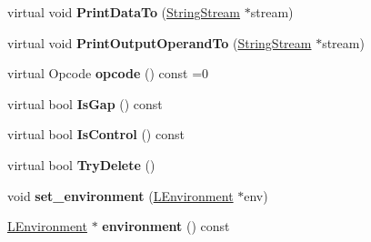 \begin{DoxyCompactItemize}
\item 
virtual void {\bfseries Print\+Data\+To} (\hyperlink{classv8_1_1internal_1_1_string_stream}{String\+Stream} $\ast$stream)\hypertarget{classv8_1_1internal_1_1_l_instruction_a3e3375f04ff4ab46cd75200cfa1b918d}{}\label{classv8_1_1internal_1_1_l_instruction_a3e3375f04ff4ab46cd75200cfa1b918d}

\item 
virtual void {\bfseries Print\+Output\+Operand\+To} (\hyperlink{classv8_1_1internal_1_1_string_stream}{String\+Stream} $\ast$stream)\hypertarget{classv8_1_1internal_1_1_l_instruction_af5f97137ae7c1b7af3737b41c235f28f}{}\label{classv8_1_1internal_1_1_l_instruction_af5f97137ae7c1b7af3737b41c235f28f}

\item 
virtual Opcode {\bfseries opcode} () const  =0\hypertarget{classv8_1_1internal_1_1_l_instruction_aa0129e8a782b2dd3d9753986e3d245f1}{}\label{classv8_1_1internal_1_1_l_instruction_aa0129e8a782b2dd3d9753986e3d245f1}

\item 
virtual bool {\bfseries Is\+Gap} () const \hypertarget{classv8_1_1internal_1_1_l_instruction_a96115165585397545ac4945072c27dfc}{}\label{classv8_1_1internal_1_1_l_instruction_a96115165585397545ac4945072c27dfc}

\item 
virtual bool {\bfseries Is\+Control} () const \hypertarget{classv8_1_1internal_1_1_l_instruction_a2cc159f22c6519accebaa83d4e554dd7}{}\label{classv8_1_1internal_1_1_l_instruction_a2cc159f22c6519accebaa83d4e554dd7}

\item 
virtual bool {\bfseries Try\+Delete} ()\hypertarget{classv8_1_1internal_1_1_l_instruction_ae33f8094c99e0ec89bc4020a5de93187}{}\label{classv8_1_1internal_1_1_l_instruction_ae33f8094c99e0ec89bc4020a5de93187}

\item 
void {\bfseries set\+\_\+environment} (\hyperlink{classv8_1_1internal_1_1_l_environment}{L\+Environment} $\ast$env)\hypertarget{classv8_1_1internal_1_1_l_instruction_a151c380b67119265805b298e84f3f7db}{}\label{classv8_1_1internal_1_1_l_instruction_a151c380b67119265805b298e84f3f7db}

\item 
\hyperlink{classv8_1_1internal_1_1_l_environment}{L\+Environment} $\ast$ {\bfseries environment} () const \hypertarget{classv8_1_1internal_1_1_l_instruction_a45cda998008ef156449db808af234708}{}\label{classv8_1_1internal_1_1_l_instruction_a45cda998008ef156449db808af234708}


\end{DoxyCompactItemize}
